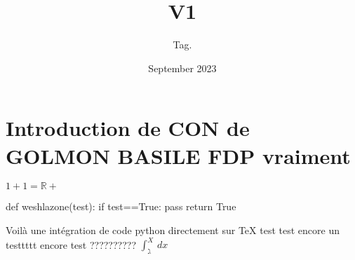 \documentclass{article}
\title{V1}
\author{Tag. }
\date{September 2023}
\begin{document}
\maketitle

\section{Introduction de CON de GOLMON BASILE FDP  vraiment}
$1+1=\mathbb{R+}$
\begin{python}
def weshlazone(test):
    if test==True:
        pass
    return True
\end{python}
Voilà une intégration de code python directement sur TeX
test test encore un testtttt encore test ??????????
$\int_{\gimel }^{X } \,dx$ 
    
\end{document}
